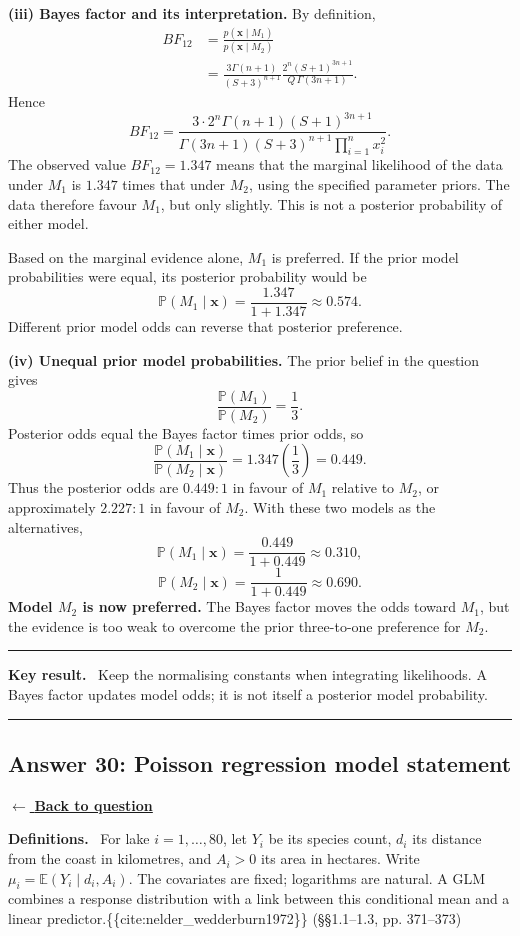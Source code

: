 \documentclass[11pt,a4paper]{article}
\newcommand{\given}{\mathrel{|}}
\newcommand{\xvec}{\boldsymbol{x}}
\newcommand{\E}{\mathbb{E}}
\newcommand{\answernav}[1]{%
  \label{answer:#1}%
  \noindent\hyperref[question:#1]{$\leftarrow$ \textbf{Back to question}}%
  \par\smallskip}
\newcommand{\studyheading}[1]{%
  \par\medskip\noindent\textcolor{statblue}{\textbf{#1.}}\ }
\newenvironment{keyresult}
  {\begin{center}\begin{minipage}{0.92\linewidth}\color{statblue}%
   \hrule\vspace{6pt}\textbf{Key result.}\ }
  {\vspace{6pt}\hrule\end{minipage}\end{center}}
\begin{document}
\textbf{(iii) Bayes factor and its interpretation.}
By definition,
\[
\begin{aligned}
BF_{12}
&=\frac{p(\xvec\mid M_1)}{p(\xvec\mid M_2)}\\
&=\frac{3\Gamma(n+1)}{(S+3)^{n+1}}
\frac{2^n(S+1)^{3n+1}}{Q\,\Gamma(3n+1)}.
\end{aligned}
\]
Hence
\[
\boxed{BF_{12}
=\frac{3\cdot2^n\Gamma(n+1)(S+1)^{3n+1}}
{\Gamma(3n+1)(S+3)^{n+1}\prod_{i=1}^{n}x_i^2}.}
\]
The observed value $BF_{12}=1.347$ means that the marginal likelihood of
the data under $M_1$ is $1.347$ times that under $M_2$, using the specified
parameter priors. The data therefore favour $M_1$, but only slightly.
This is not a posterior probability of either model.

Based on the marginal evidence alone, $M_1$ is preferred. If the prior
model probabilities were equal, its posterior probability would be
\[
\mathbb{P}(M_1\mid\xvec)=\frac{1.347}{1+1.347}\approx0.574.
\]
Different prior model odds can reverse that posterior preference.

\textbf{(iv) Unequal prior model probabilities.}
The prior belief in the question gives
\[
\frac{\mathbb{P}(M_1)}{\mathbb{P}(M_2)}=\frac13.
\]
Posterior odds equal the Bayes factor times prior odds, so
\[
\boxed{
\frac{\mathbb{P}(M_1\mid\xvec)}{\mathbb{P}(M_2\mid\xvec)}
=1.347\left(\frac13\right)=0.449.
}
\]
Thus the posterior odds are $0.449:1$ in favour of $M_1$ relative to
$M_2$, or approximately $2.227:1$ in favour of $M_2$. With these two
models as the alternatives,
\[
\mathbb{P}(M_1\mid\xvec)=\frac{0.449}{1+0.449}\approx0.310,
\]
\[
\mathbb{P}(M_2\mid\xvec)=\frac1{1+0.449}\approx0.690.
\]
\textbf{Model $M_2$ is now preferred.} The Bayes factor moves the odds
toward $M_1$, but the evidence is too weak to overcome the prior three-to-one
preference for $M_2$.

\begin{keyresult}
Keep the normalising constants when integrating likelihoods. A Bayes factor
updates model odds; it is not itself a posterior model probability.
\end{keyresult}

\clearpage

\subsection{Answer 30: Poisson regression model statement}
\answernav{30}

\studyheading{Definitions}
For lake $i=1,\ldots,80$, let $Y_i$ be its species count, $d_i$ its distance from the coast in kilometres, and $A_i>0$ its area in hectares.
Write $\mu_i=\E(Y_i\given d_i,A_i)$.
The covariates are fixed; logarithms are natural.
A GLM combines a response distribution with a link between this conditional mean and a linear predictor.\{\{cite:nelder_wedderburn1972\}\} (§§1.1–1.3, pp. 371–373)
\end{document}
